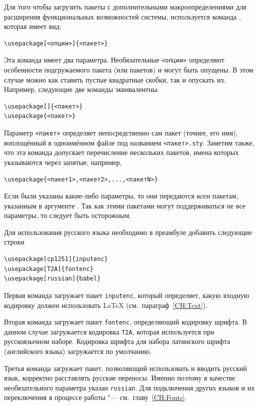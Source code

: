 Для того чтобы загрузить пакеты с дополнительными макроопределениями для расширения функциональных возможностей системы, используется команда , которая имеет вид:
\begin{verbatim}
\usepackage[<опции>]{<пакет>}
\end{verbatim}
Эта команда имеет два параметра. Необязательные \texttt{<опции>} определяют особенности подгружаемого пакета (или пакетов) и могут быть опущены. В этом случае можно как ставить пустые квадратные скобки, так и опускать их. Например, следующие две команды эквивалентны:
\begin{verbatim}
\usepackage[]{<пакет>}
\usepackage{<пакет>}
\end{verbatim}
Параметр \verb|<пакет>| определяет непосредственно сам пакет (точнее, его имя), воплощённый в одноимённом файле под названием \verb|<пакет>.sty|. Заметим также, что эта команда допускает перечисление нескольких пакетов, имена которых указываются через запятые, например,
\begin{verbatim}
\usepackage{<пакет1>,<пакет2>,...,<пакетN>}
\end{verbatim}

\begin{note}
Если были указаны какие-либо параметры, то они передаются \emph{всем} пакетам, указанным в аргументе . Так как этими пакетами могут поддерживаться не все параметры, то следует быть осторожным.
\end{note}

Для использования русского языка необходимо в преамбуле добавить следующие строки
\begin{verbatim}
\usepackage[cp1251]{inputenc}
\usepackage[T2A]{fontenc}
\usepackage[russian]{babel}
\end{verbatim}

Первая команда загружает пакет \texttt{inputenc}, который определяет, какую входную кодировку должен использовать \LaTeX{} (см.\ параграф~\ref{CH:Text}).

Вторая команда загружает пакет \texttt{fontenc}, определяющий кодировку шрифта. В данном случае загружается кодировка \texttt{T2A}, которая используется при русскоязычном наборе. Кодировка шрифта для набора латинского шрифта (английского языка) загружается по умолчанию.

Третья команда загружает пакет, позволяющий использовать и вводить русский язык, корректно расставлять русские переносы. Именно поэтому в качестве необязательного параметра указан \texttt{russian}. Для подключения других языков и их переключения в процессе работы "--- см.\ главу~\ref{CH:Fonts}.\medskip

